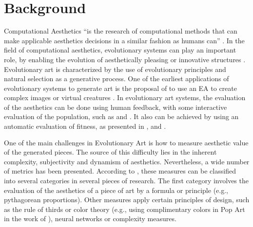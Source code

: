 \section{Background}

\noindent Computational Aesthetics ``is the research of computational
methods that can make applicable aesthetics decisions in a similar
fashion as humans can'' \cite{COMPAESTH}. In the field of
computational aesthetics, evolutionary systems can play an important
role, by enabling the evolution of aesthetically pleasing or
innovative structures \cite{dipaola2009incorporating}. Evolutionary
art is characterized by the use of evolutionary principles and natural
selection as a generative process. One of the earliest applications of
evolutionary systems to generate art is the proposal of 
to use an EA to create complex images \cite{sims1991artificial} or
virtual creatures  \cite{sims1994evolving}. In evolutionary art
systems, the evaluation of the aesthetics can be done using human
feedback, with some interactive evaluation of the population, such as
\cite{ashlock2006evolutionary,draves2006electric,moroni2000vox} and
\cite{sims1991artificial}. It also can be achieved by using an
automatic evaluation of fitness, as presented in
\cite{aguilar2008robotic,den2010comparing,dipaola2009incorporating,li2012investigating},
and \cite{sims1994evolving}. %

One of the main challenges in Evolutionary Art is how to measure
aesthetic value of the generated pieces. The source of this difficulty
lies in the inherent complexity, subjectivity and dynamism of
aesthetics. Nevertheless, a wide number of metrics has been
presented. According to 
\cite{galanter2012computational}, these measures can be classified
into several categories in several pieces of research. The first
category involves the evaluation of the aesthetics of a piece of art
by a formula or principle (e.g., pythagorean proportions). Other
measures apply certain principles of design, such as the rule of
thirds or color theory (e.g., using complimentary colors in Pop Art in
the work of  \cite{den2012evolving}),
neural networks or complexity measures.   %

